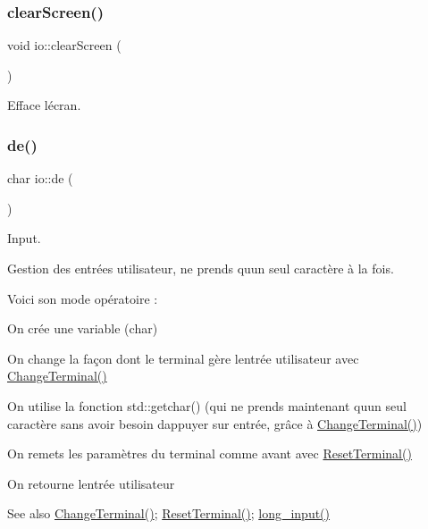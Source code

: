 \subsubsection{\texorpdfstring{clear\+Screen()}{clearScreen()}}
{\footnotesize\ttfamily void io\+::clear\+Screen (\begin{DoxyParamCaption}{ }\end{DoxyParamCaption})}



Efface l\textquotesingle{}écran. 

\mbox{\label{namespaceio_ae9908b55f26f07e78043d7cfad003d22}} 
\subsubsection{\texorpdfstring{de()}{de()}}
{\footnotesize\ttfamily char io\+::de (\begin{DoxyParamCaption}{ }\end{DoxyParamCaption})}



Input. 

Gestion des entrées utilisateur, ne prends qu\textquotesingle{}un seul caractère à la fois.

Voici son mode opératoire \+:
\begin{DoxyEnumerate}
\item On crée une variable (char)
\item On change la façon dont le terminal gère l\textquotesingle{}entrée utilisateur avec \hyperlink{namespaceio_ac0223d0ecfee82d8cc86543604173b73}{Change\+Terminal()}
\item On utilise la fonction std\+::getchar() (qui ne prends maintenant qu\textquotesingle{}un seul caractère sans avoir besoin d\textquotesingle{}appuyer sur entrée, grâce à \hyperlink{namespaceio_ac0223d0ecfee82d8cc86543604173b73}{Change\+Terminal()})
\item On remets les paramètres du terminal comme avant avec \hyperlink{namespaceio_a44a79937063c75bdcd8f042d5f55d501}{Reset\+Terminal()}
\item On retourne l\textquotesingle{}entrée utilisateur
\end{DoxyEnumerate}

\begin{DoxySeeAlso}{See also}
\hyperlink{namespaceio_ac0223d0ecfee82d8cc86543604173b73}{Change\+Terminal()}; \hyperlink{namespaceio_a44a79937063c75bdcd8f042d5f55d501}{Reset\+Terminal()}; \hyperlink{namespaceio_ab044be3afd7ac04eeb1a496af0f1d5c6}{long\+\_\+input()} 
\end{DoxySeeAlso}
\mbox{\label{namespaceio_ab7da8a98a7b636d1d5f0f6eb820f1f81}} 

